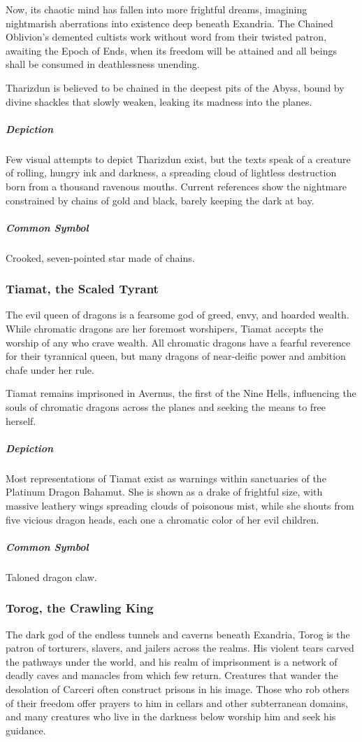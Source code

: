 \documentclass[letterpaper, twocolumn, openany, nodeprecatedcode, layout=true]{dndbook}
\begin{document}
Now, its chaotic mind has fallen into more frightful dreams, imagining nightmarish
aberrations into existence deep beneath Exandria. The Chained Oblivion’s demented cultists
work without word from their twisted patron, awaiting the Epoch of Ends, when its freedom will
be attained and all beings shall be consumed in deathlessness unending.

Tharizdun is believed to be chained in the deepest pits of the Abyss, bound by divine shackles
that slowly weaken, leaking its madness into the planes.

\subparagraph{Depiction}
Few visual attempts to depict Tharizdun exist, but the texts speak of a creature of rolling,
hungry ink and darkness, a spreading cloud of lightless destruction born from a thousand
ravenous mouths. Current references show the nightmare constrained by chains of gold and
black, barely keeping the dark at bay.

\subparagraph{Common Symbol}
Crooked, seven-pointed star made of chains.

\subsubsection{Tiamat, the Scaled Tyrant}

The evil queen of dragons is a fearsome god of greed, envy, and hoarded wealth. While
chromatic dragons are her foremost worshipers, Tiamat accepts the worship of any who
crave wealth. All chromatic dragons have a fearful reverence for their tyrannical queen,
but many dragons of near-deific power and ambition chafe under her rule.

Tiamat remains imprisoned in Avernus, the first of the Nine Hells, influencing the souls
of chromatic dragons across the planes and seeking the means to free herself.

\subparagraph{Depiction}
Most representations of Tiamat exist as warnings within sanctuaries of the Platinum Dragon
Bahamut. She is shown as a drake of frightful size, with massive leathery wings spreading
clouds of poisonous mist, while she shouts from five vicious dragon heads, each one a chromatic
color of her evil children.

\subparagraph{Common Symbol}
Taloned dragon claw.

\subsubsection{Torog, the Crawling King}

The dark god of the endless tunnels and caverns beneath Exandria, Torog is the patron of
torturers, slavers, and jailers across the realms. His violent tears carved the pathways
under the world, and his realm of imprisonment is a network of deadly caves and manacles
from which few return. Creatures that wander the desolation of Carceri often construct prisons
in his image. Those who rob others of their freedom offer prayers to him in cellars and other
subterranean domains, and many creatures who live in the darkness below worship him and seek
his guidance.
\end{document}
